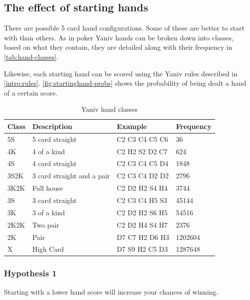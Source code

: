 \documentclass[../main.tex]{subfiles}
\begin{document}
\subsection{The effect of starting hands}
There are  possible 5 card hand configurations. Some of these are better to start with than others. As in poker Yaniv hands can be broken down into classes, based on what they contain, they are detailed along with their frequency in \autoref{tab:hand-classes}. 

Likewise, each starting hand can be scored using the Yaniv rules described in \autoref{intro:rules}. \autoref{fig:startinghand-probs} shows the probability of being dealt a hand of a certain score.

\begin{table}[]
\centering
\begin{tabular}{@{}llll@{}}
\toprule
Class & Description                           & Example        & Frequency \\ \midrule
5S    & 5 card straight                       & C2 C3 C4 C5 C6 & 36        \\
4K    & 4 of a kind                           & C2 H2 S2 D2 C7 & 624       \\
4S    & 4 card straight                       & C2 C3 C4 C5 D4 & 1848      \\
3S2K  & 3 card straight and a pair            & C2 C3 C4 D2 D2 & 2796      \\
3K2K  & Full house                            & C2 D2 H2 S4 H4 & 3744      \\
3S    & 3 card straight                       & C2 C3 C4 H5 S3 & 45144     \\
3K    & 3 of a kind                           & C2 D2 H2 S6 H5 & 54516     \\
2K2K  & Two pair                              & C2 D2 H4 S4 H7 & 2376      \\
2K    & Pair                                  & D7 C7 H2 D6 H3 & 1202604   \\
X     & High Card                             & D7 S9 H2 C5 D3 & 1287648   \\ \bottomrule
\end{tabular}
\caption{Yaniv hand classes}
\label{tab:hand-classes}
\end{table}

\subsubsection{Hypothesis 1}
\begin{displayquote}
Starting with a lower hand score will increase your chances of winning. 
\end{displayquote}
\end{document}
